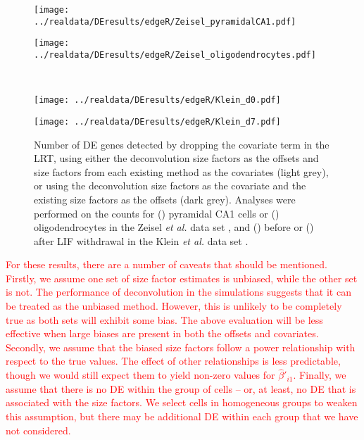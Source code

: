 \documentclass{article}
\newcommand\revised[1]{\textcolor{red}{#1}}
\begin{document}
\begin{figure}[btp]
    \begin{center}
        \begin{minipage}{0.48\textwidth}
            \texttt{[image: ../realdata/DEresults/edgeR/Zeisel\_pyramidalCA1.pdf]}
            \subcaption{}\label{subfig:assess_pyramidal}
        \end{minipage}
        \begin{minipage}{0.48\textwidth}
            \texttt{[image: ../realdata/DEresults/edgeR/Zeisel\_oligodendrocytes.pdf]}
            \subcaption{}\label{subfig:assess_oligodendrocytes}
        \end{minipage}\\[0.1in]
        \begin{minipage}{0.48\textwidth}
            \texttt{[image: ../realdata/DEresults/edgeR/Klein\_d0.pdf]}
            \subcaption{}\label{subfig:assess_d0}
        \end{minipage}
        \begin{minipage}{0.48\textwidth}
            \texttt{[image: ../realdata/DEresults/edgeR/Klein\_d7.pdf]}
            \subcaption{}\label{subfig:assess_d7}
        \end{minipage}
    \end{center}
    \caption{Number of DE genes detected by dropping the covariate term in the LRT, using either the deconvolution size factors as the offsets and size factors from each existing method as the covariates (light grey), or using the deconvolution size factors as the covariate and the existing size factors as the offsets (dark grey).
        Analyses were performed on the counts for () pyramidal CA1 cells or () oligodendrocytes in the Zeisel \textit{et al.} data set \cite{zeisel2015brain}, and () before or () after LIF withdrawal in the Klein \textit{et al.} data set \cite{klein2015droplet}.
    }
    \label{fig:assessment_results}
\end{figure}

\revised{For these results, there are a number of caveats that should be mentioned. 
Firstly, we assume one set of size factor estimates is unbiased, while the other set is not.
The performance of deconvolution in the simulations suggests that it can be treated as the unbiased method.
However, this is unlikely to be completely true as both sets will exhibit some bias.
The above evaluation will be less effective when large biases are present in both the offsets and covariates.
Secondly, we assume that the biased size factors follow a power relationship with respect to the true values.
The effect of other relationships is less predictable, though we would still expect them to yield non-zero values for $\hat\beta'_{i1}$.
Finally, we assume that there is no DE within the group of cells -- or, at least, no DE that is associated with the size factors.
We select cells in homogeneous groups to weaken this assumption, but there may be additional DE within each group that we have not considered.
}
\end{document}

